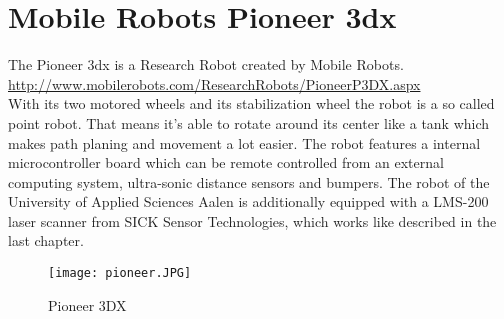 \section{Mobile Robots Pioneer 3dx}
The Pioneer 3dx is a Research Robot created by Mobile Robots.
\\
\url{http://www.mobilerobots.com/ResearchRobots/PioneerP3DX.aspx}
\\
With its two motored wheels and its stabilization wheel the robot is a so called point robot. That means it's able to 
rotate around its center like a tank which makes path planing and movement a lot easier. 
The robot features a internal microcontroller board which can be remote controlled from an external computing system, 
ultra-sonic distance sensors and bumpers. The robot of the University of Applied Sciences Aalen 
is additionally equipped with a LMS-200 laser scanner from SICK Sensor Technologies, which works
like described in the last chapter.


\begin{figure}[htp]
\begin{center}
  \texttt{[image: pioneer.JPG]}
  \caption{Pioneer 3DX}
  \label{figure:Pioneer}
\end{center}
\end{figure}




 

 
